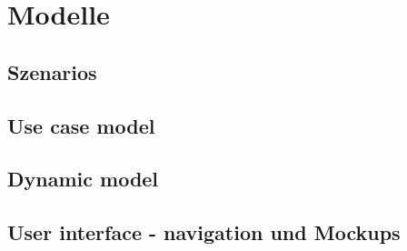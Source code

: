 \chapter{Modelle}
\section{Szenarios}
\section{Use case model}
\section{Dynamic model}
\section{User interface - navigation und Mockups}
